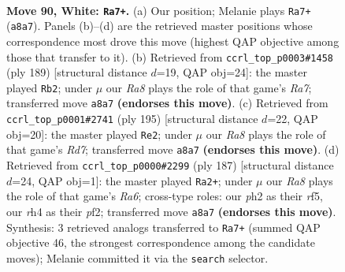 \documentclass[11pt]{article}
\begin{document}
\clearpage

\begin{figure}[p]\centering
\begin{subfigure}{0.46\textwidth}\centering
\resizebox{\linewidth}{!}{%
\newchessgame
\chessboard[
  setfen={R7/6k1/8/7n/p6r/P7/7p/7K w - - 6 90},
  showmover=false,
  pgfstyle=straightmove, color=movearrow, markmove={a8-a7}
]}
\caption{}
\end{subfigure}\hfill
\begin{subfigure}{0.46\textwidth}\centering
\resizebox{\linewidth}{!}{%
\newchessgame
\chessboard[
  setfen={8/8/4K3/pPk5/P5R1/8/r7/8 b - - 88 95},
  showmover=false,
  pgfstyle=straightmove, color=movearrow, markmove={a2-b2}
]}
\caption{}
\end{subfigure}
\\[4pt]
\begin{subfigure}{0.46\textwidth}\centering
\resizebox{\linewidth}{!}{%
\newchessgame
\chessboard[
  setfen={8/6k1/4R1P1/2K5/4P3/8/3r4/8 b - - 72 98},
  showmover=false,
  pgfstyle=straightmove, color=movearrow, markmove={d2-e2}
]}
\caption{}
\end{subfigure}\hfill
\begin{subfigure}{0.46\textwidth}\centering
\resizebox{\linewidth}{!}{%
\newchessgame
\chessboard[
  setfen={8/8/7k/5R2/6p1/r5P1/3K1P2/8 b - - 93 94},
  showmover=false,
  pgfstyle=straightmove, color=movearrow, markmove={a3-a2}
]}
\caption{}
\end{subfigure}
\caption{\textbf{Move 90, White: \texttt{Ra7+}.} (a) Our position; Melanie plays \texttt{Ra7+} (\texttt{a8a7}). Panels (b)--(d) are the retrieved master positions whose correspondence most drove this move (highest QAP objective among those that transfer to it). (b) Retrieved from \texttt{ccrl\_top\_p0003\#1458} (ply 189) [structural distance $d$=19, QAP obj=24]: the master played \texttt{Rb2}; under $\mu$ our \emph{Ra8} plays the role of that game's \emph{Ra7}; transferred move \texttt{a8a7} \textbf{(endorses this move)}. (c) Retrieved from \texttt{ccrl\_top\_p0001\#2741} (ply 195) [structural distance $d$=22, QAP obj=20]: the master played \texttt{Re2}; under $\mu$ our \emph{Ra8} plays the role of that game's \emph{Rd7}; transferred move \texttt{a8a7} \textbf{(endorses this move)}. (d) Retrieved from \texttt{ccrl\_top\_p0000\#2299} (ply 187) [structural distance $d$=24, QAP obj=1]: the master played \texttt{Ra2+}; under $\mu$ our \emph{Ra8} plays the role of that game's \emph{Ra6}; cross-type roles: our \emph{p}h2 as their \emph{r}f5, our \emph{r}h4 as their \emph{p}f2; transferred move \texttt{a8a7} \textbf{(endorses this move)}. Synthesis: 3 retrieved analogs transferred to \texttt{Ra7+} (summed QAP objective 46, the strongest correspondence among the candidate moves); Melanie committed it via the \texttt{search} selector.}
\label{fig:thought-m178}
\end{figure}
\end{document}
